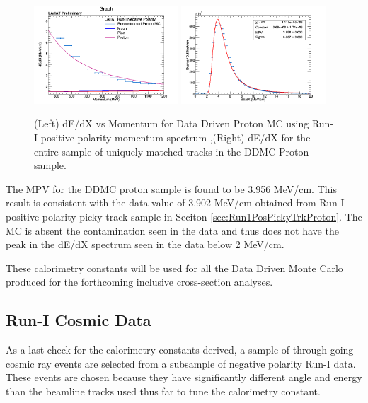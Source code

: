 \begin{figure}[htb]
\centering
\includegraphics[width=0.48\textwidth]{images/dEdXvsMomentumProtonMCVeryFineBin.png}
\includegraphics[width=0.48\textwidth]{images/dEdXDDMCProtonRunI.png}
\caption{(Left) dE/dX vs Momentum for Data Driven Proton MC using Run-I positive polarity momentum spectrum ,(Right) dE/dX for the entire sample of uniquely matched tracks in the DDMC Proton sample.}
\label{fig:DDMCProtonResults}
\end{figure}


The MPV for the DDMC proton sample is found to be 3.956 MeV/cm. This result is consistent with the data value of 3.902 MeV/cm obtained from Run-I positive polarity picky track sample in Seciton \ref{sec:Run1PosPickyTrkProton}. The MC is absent the contamination seen in the data and thus does not have the peak in the dE/dX spectrum seen in the data below 2 MeV/cm.


These calorimetry constants will be used for all the Data Driven Monte Carlo produced for the forthcoming inclusive cross-section analyses.
\newpage
\subsection{Run-I Cosmic Data}\label{sec:RunICosmics}

As a last check for the calorimetry constants derived, a sample of through going cosmic ray events are selected from a subsample of negative polarity Run-I data. These events are chosen because they have significantly different angle and energy than the beamline tracks used thus far to tune the calorimetry constant.

